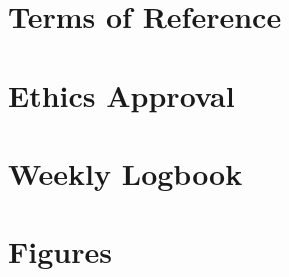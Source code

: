 \documentclass[11pt, twoside, a4paper]{report}
\newcommand*\cleartoleftpage{%
  \clearpage
  \ifodd\value{page}\hbox{}\newpage\fi
}
\begin{document}
\section{Terms of Reference}


\section{Ethics Approval}\label{sec:ethics_approval}


\section{Weekly Logbook}
\raggedbottom{}

\flushbottom{}



\cleartoleftpage\section{Figures}




\todos{}

\end{document}

